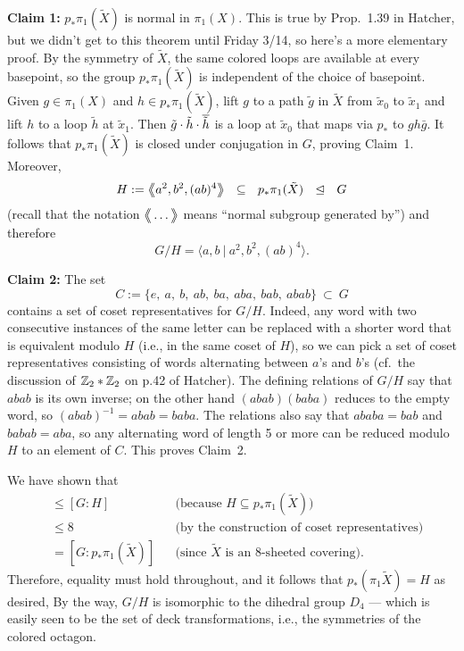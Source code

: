 {\bf Claim 1:} $p_*\pi_1(\tilde X)$ is normal in $\pi_1(X)$.  This is true by Prop.~1.39 in Hatcher, but we didn't get to this theorem until Friday 3/14, so here's a more elementary proof.  By the symmetry of $\tilde X$, the same colored loops are available at every basepoint, so 
the group $p_*\pi_1(\tilde X)$ is independent of the choice of basepoint.  Given $g\in\pi_1(X)$ and $h\in p_*\pi_1(\tilde X)$,  lift $g$ to a path $\tilde g$ in $\tilde X$ from $\tilde x_0$ to $\tilde x_1$ and lift $h$ to a loop $\tilde h$ at $\tilde x_1$.  Then $\tilde g\cdot\tilde h\cdot\overline{{\tilde h}}$ is a loop at $\tilde x_0$ that maps via $p_*$ to $gh\bar g$.  It follows that $p_*\pi_1(\tilde X)$ is closed under conjugation in $G$, proving Claim~1.  Moreover,
\[H:=\Langle a^2,b^2,(ab)^4\Rangle \ \ \subseteq \ \ p_*\pi_1(\tilde X) \ \ \trianglelefteq \ \ G\]
(recall that the notation $\big\langle\!\!\big\langle\dots\big\rangle\!\!\big\rangle$ means ``normal subgroup generated by'') and therefore
\[G/H = \langle a,b ~|~ a^2,b^2,(ab)^4\rangle.\]

{\bf Claim 2:} The set
\[C := \{e,\ a,\ b,\ ab,\ ba,\ aba,\ bab,\ abab\} \ \subset\ G\]
contains a set of coset representatives for $G/H$.
Indeed, any word with two consecutive instances of the same letter can be replaced with a shorter word that is equivalent modulo $H$ (i.e., in the same coset of $H$), so we can pick a set of coset representatives consisting of words alternating between $a$'s and $b$'s (cf.\ the discussion of $\mathbb{Z}_2*\mathbb{Z}_2$ on p.42 of Hatcher).  The defining relations of $G/H$ say that $abab$ is its own inverse; on the other hand $(abab)(baba)$ reduces to the empty word, so $(abab)^{-1}=abab=baba$.  The relations also say that $ababa=bab$ and $babab=aba$, so
any alternating word of length 5 or more can be reduced modulo $H$ to an element of $C$.  This proves Claim~2.

We have shown that
\begin{align*}
[G:p_*\pi_1(\tilde X)] &\leq [G:H] && \text{(because $H\subseteq p_*\pi_1(\tilde X)$)}\\
&\leq 8 && \text{(by the construction of coset representatives)}\\
&= [G:p_*\pi_1(\tilde X)] && \text{(since $\tilde X$ is an 8-sheeted covering).}
\end{align*}
Therefore, equality must hold throughout, and it follows that $p_*(\pi_1\tilde X)=H$ as desired,  By the way, $G/H$ is isomorphic to the dihedral group $D_4$ --- which is easily seen to be the set of deck transformations, i.e., the symmetries of the colored octagon.


